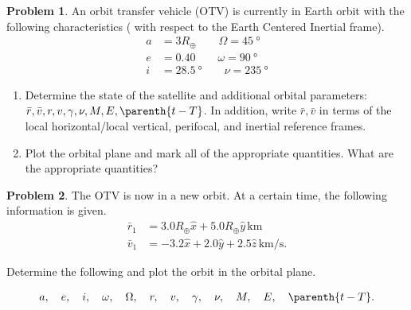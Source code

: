 \documentclass[10pt]{article}
\theoremstyle{definition}
\newtheorem{prob}{Problem}[section]
\newenvironment{subprob}%
{\renewcommand{\theenumi}{\alph{enumi}}\renewcommand{\labelenumi}{(\theenumi)}\begin{enumerate}}%
{\end{enumerate}}%
\begin{document}
\begin{prob}
    An orbit transfer vehicle (OTV) is currently in Earth orbit with the following characteristics ( with respect to the Earth Centered Inertial frame).
    \begin{align*}
        a &= 3 R_{\oplus} \qquad \Omega = \SI{45}{\degree} \\
        e &= 0.40 \qquad \omega = \SI{90}{\degree} \\
        i &= \SI{28.5}{\degree} \qquad \nu = \SI{235}{\degree}
    \end{align*}

    \begin{subprob}
    \item Determine the state of the satellite and additional orbital parameters: \( \bar r, \bar v, r, v, \gamma, \nu, M , E, \parenth{t - T}\).
        In addition, write \( \bar r, \bar v \) in terms of the local horizontal/local vertical, perifocal, and inertial reference frames.
    \item Plot the orbital plane and mark all of the appropriate quantities.
        What are the appropriate quantities?
    \end{subprob}
\end{prob}

\begin{prob}
    The OTV is now in a new orbit.
    At a certain time, the following information is given.
    \begin{align*}
        \bar r_1 &= 3.0 R_\oplus \hat x + 5.0 R_\oplus \hat y \, \si{\kilo\meter}\\
        \bar v_1 &= -3.2 \hat x + 2.0 \hat y + 2.5 \hat z \, \si{\kilo\meter\per\second} .
    \end{align*}

    Determine the following and plot the orbit in the orbital plane.

    \begin{align*}
        a, \quad e, \quad i, \quad \omega, \quad \Omega, \quad r, \quad v, \quad \gamma, \quad \nu, \quad M, \quad E, \quad \parenth{t - T}.
    \end{align*}
\end{prob}

\end{document}
